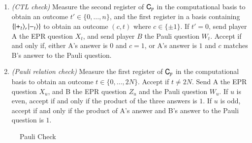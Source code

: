 \begin{center}
\begin{mdframed}
\begin{enumerate}
\item \emph{(CTL check)} Measure the second register of ${\textsf{C}}_{p}$ in the computational basis to obtain an outcome $t'\in\{0,\ldots,n\}$, and the first register in a basis containing $\{|+_t\rangle,|-_t\rangle\}$ to obtain an outcome $(c,t)$ where $c\in\{\pm 1\}$. If $t'=0$, send player A the EPR question $X_{t}$, and send player $B$ the Pauli question $W_t$. Accept if and only if, either A's answer is $0$ and $c=1$, or A's answer is $1$ and $c$ matches B's answer to the Pauli question. %

\item{\emph{(Pauli relation check)}} Measure the first register of ${\textsf{C}}_p$  in the computational basis to obtain an outcome $t\in\{0,\ldots,2N\}$. Accept if $t\neq 2N$. Send A the EPR question $X_u$, and B the EPR question $Z_u$ and the Pauli question $W_u$. If $u$ is even, accept if and only if the product of the three answers is $1$. If $u$ is odd, accept if and only if the product of A's answer and B's answer to the Pauli question is $1$. 
	\end{enumerate}    
\end{mdframed}
\end{center}
\begin{figure}[H]
\caption{Pauli Check}
\label{fig:pauli_check}
\end{figure}


